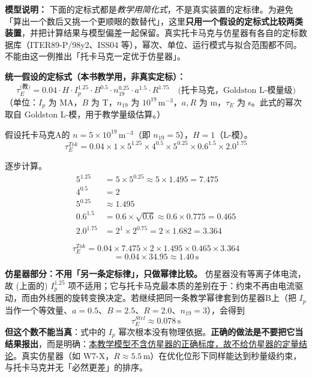 \textbf{模型说明：} 下面的定标式都是\emph{教学用简化式}，不是真实装置的定标律。为避免「算出一个数后又挑一个更顺眼的数替代」，这里\textbf{只用一个假设的定标式比较两类装置}，并把计算结果与模型偏差一起保留。真实托卡马克与仿星器有各自的定标数据库（ITER89-P/98y2、ISS04 等），幂次、单位、运行模式与拟合范围都不同。不能由这一例推出「托卡马克一定优于仿星器」。

\textbf{统一假设的定标式（本书教学用，非真实定标）：}
\begin{equation}
    \tau_E^{\text{(教)}} = 0.04 \cdot H \cdot I_p^{1.25} \cdot B^{0.5} \cdot n_{19}^{0.25} \cdot a^{1.5} \cdot R^{1.75}\quad\text{(托卡马克，Goldston L-模量级)}
    \label{eq:ch10-tokamak-scaling}
\end{equation}
（单位：$I_p$ 为 MA，$B$ 为 T，$n_{19}$ 为 $10^{19}\,\mathrm{m^{-3}}$，$a,R$ 为 m，$\tau_E$ 为 s。此式的幂次取自 Goldston L-模，用于教学量级估算。）

假设托卡马克A的 $n=5\times10^{19}\,\mathrm{m^{-3}}$（即 $n_{19}=5$），$H=1$（L-模）。
\[
    \tau_E^{Tok} = 0.04 \times 1 \times 5^{1.25} \times 4^{0.5} \times 5^{0.25} \times 0.6^{1.5} \times 2.0^{1.75}
\]

逐步计算。
\begin{align*}
    5^{1.25} &= 5 \times 5^{0.25} \approx 5 \times 1.495 = 7.475 \\
    4^{0.5} &= 2 \\
    5^{0.25} &\approx 1.495 \\
    0.6^{1.5} &= 0.6\times\sqrt{0.6} \approx 0.6\times0.775 = 0.465 \\
    2.0^{1.75} &= 2^1 \times 2^{0.75} = 2 \times 1.682 = 3.364
\end{align*}

\[
    \tau_E^{Tok} = 0.04 \times 7.475 \times 2 \times 1.495 \times 0.465 \times 3.364
\]
\[
    = 0.04 \times 34.95 \approx 1.40\,\mathrm{s}
\]

\textbf{仿星器部分：不用「另一条定标律」，只做幂律比较。} 仿星器没有等离子体电流，故 (上面的) $I_p^{1.25}$ 项不适用；它与托卡马克最本质的差别在于：约束不再由电流驱动，而由外线圈的旋转变换决定。若继续把同一条教学幂律套到仿星器B上（把 $I_p$ 当作一个等效量、$a=0.5$、$B=2.5$、$R=2.0$、$n_{19}=3$），会得到
\[
    \tau_E^{Stel} \approx 0.078\,\mathrm{s}
\]
\textbf{但这个数不能当真}：式中的 $I_p$ 幂次根本没有物理依据。\textbf{正确的做法是不要把它当结果报出}，而是明确：\underline{本教学模型不含仿星器的正确标度，故不给仿星器的定量结论}。真实仿星器（如 W7-X，$R\approx5.5\,\mathrm{m}$）在优化位形下同样能达到秒量级约束，与托卡马克并无「必然更差」的排序。

